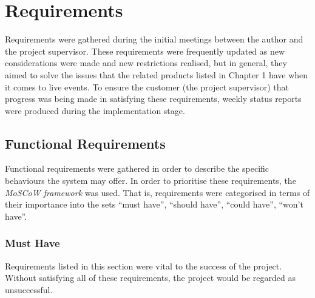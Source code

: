 \documentclass{l4proj}
\begin{document}
\chapter{Requirements}

Requirements were gathered during the initial meetings between the author and the project supervisor. These requirements were frequently updated as new considerations were made and new restrictions realised, but in general, they aimed to solve the issues that the related products listed in Chapter 1 have when it comes to live events. To ensure the customer (the project supervisor) that progress was being made in satisfying these requirements, weekly status reports were produced during the implementation stage. 

    \section{Functional Requirements}
    
    Functional requirements were gathered in order to describe the specific behaviours the system may offer. In order to prioritise these requirements, the \textit{MoSCoW framework} was used. That is, requirements were categorised in terms of their importance into the sets ``must have'', ``should have'', ``could have'', ``won't have''.
    
    \subsection{Must Have}
    
    Requirements listed in this section were vital to the success of the project. Without satisfying all of these requirements, the project would be regarded as unsuccessful. 
  
\end{document}
